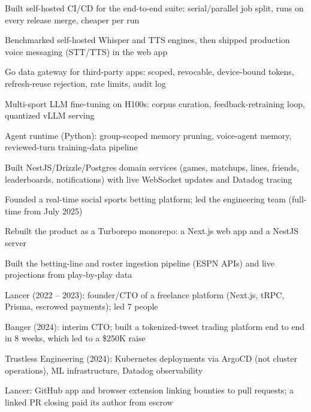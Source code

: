 \documentclass[print]{jack-resume}
\begin{document}
\begin{tightemize}
    \item Built self-hosted CI/CD for the end-to-end suite: serial/parallel job split, runs on every release merge, cheaper per run
    \item Benchmarked self-hosted Whisper and TTS engines, then shipped production voice messaging (STT/TTS) in the web app
    \item Go data gateway for third-party apps: scoped, revocable, device-bound tokens, refresh-reuse rejection, rate limits, audit log
    \item Multi-sport LLM fine-tuning on H100s: corpus curation, feedback-retraining loop, quantized vLLM serving
    \item Agent runtime (Python): group-scoped memory pruning, voice-agent memory, reviewed-turn training-data pipeline
\end{tightemize}
\sectionsep

\begin{tightemize}
    \item Built NestJS/Drizzle/Postgres domain services (games, matchups, lines, friends, leaderboards, notifications) with live WebSocket updates and Datadog tracing
    \item Founded a real-time social sports betting platform; led the engineering team (full-time from July 2025)
    \item Rebuilt the product as a Turborepo monorepo: a Next.js web app and a NestJS server
    \item Built the betting-line and roster ingestion pipeline (ESPN APIs) and live projections from play-by-play data
\end{tightemize}
\sectionsep

\begin{tightemize}
    \item Lancer (2022 -- 2023): founder/CTO of a freelance platform (Next.js, tRPC, Prisma, escrowed payments); led 7 people
    \item Banger (2024): interim CTO; built a tokenized-tweet trading platform end to end in 8 weeks, which led to a \$250K raise
    \item Trustless Engineering (2024): Kubernetes deployments via ArgoCD (not cluster operations), ML infrastructure, Datadog observability
    \item Lancer: GitHub app and browser extension linking bounties to pull requests; a linked PR closing paid its author from escrow
\end{tightemize}
\sectionsep
\end{document}
